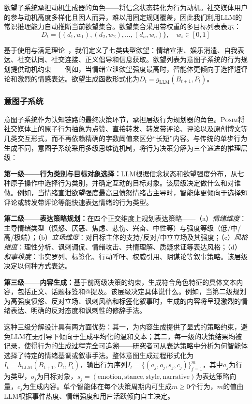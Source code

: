 \documentclass[lettersize,journal]{IEEEtran}
\newcommand{\posim}{\textsc{Posim}}
\begin{document}
欲望子系统承担动机生成器的角色——将信念状态转化为行为动机。社交媒体用户的参与动机高度多样化且因人而异，难以用固定规则覆盖，因此我们利用LLM的常识推理能力自动推断当前欲望集合。欲望集合采用带权重的多目标列表表示：
\begin{equation}
D_t = \{(d_1, w_1), (d_2, w_2), \ldots, (d_n, w_n)\}, \quad w_i \in [0, 1]
\end{equation}

基于使用与满足理论~\cite{katz_uses_1973}，我们定义了七类典型欲望：情绪宣泄、娱乐消遣、自我表达、社交认同、社交连接、正义倡导和信息获取。欲望列表为意图子系统的行为规划提供动机约束——例如，当情绪宣泄欲望强度最高时，智能体更倾向于选择短评论和激烈的情感表达。欲望生成函数形式化为$D_t = g_{\text{LLM}}(B_{t+1}, P_t)$。

\subsubsection{意图子系统}

意图子系统作为认知链路的最终决策环节，承担层级行为规划器的角色。\posim{}将社交媒体上的原子行为抽象为点赞、直接转发、转发带评论、评论以及原创博文等几类交互形式，而不再依赖精确的字数阈值来区分“长短”内容。与传统的单步行为生成不同，意图子系统采用多级思维链机制，将行为决策分解为三个递进的推理层级：

\textbf{第一级——行为类别与目标对象选择：}LLM根据信念状态和欲望强度分布，从七种原子操作中选择行为类别，并确定互动的目标对象。该层级决定做什么和对谁做。例如，当情绪宣泄欲望强度最高且愤怒情绪占主导时，智能体更倾向于选择短评论或转发带评论等能快速表达情绪的行为类型。

\textbf{第二级——表达策略规划：}在四个正交维度上规划表达策略——（a）\textit{情绪维度}：主导情绪类型（愤怒、厌恶、焦虑、悲伤、兴奋、中性等）与强度等级（低/中/高/极端）；（b）\textit{立场维度}：对目标主体的支持/反对/中立立场及其强度；（c）\textit{风格维度}：理性分析、讽刺调侃、情绪攻击、共情理解、质疑求证等表达风格；（d）\textit{叙事维度}：事实罗列、标签化、行动呼吁、权威引用、阴谋论等叙事策略。该层级决定以何种方式表达。

\textbf{第三级——内容生成：}基于前两级决策的约束，生成符合角色特征的具体文本内容，包括正文、话题标签和@提及。该层级决定具体说什么。例如，当第二级规划为高强度愤怒、反对立场、讽刺风格和标签化叙事时，生成的内容将呈现激烈的情绪表达、明确的反对态度和讽刺性的修辞手法。

这种三级分解设计具有两方面优势：其一，为内容生成提供了显式的策略约束，避免LLM在无引导下倾向于生成平均化的温和文本；其二，每一级的决策结果均被记录，使得行为的生成过程完全可追溯——研究者可从表达策略中分析为何智能体选择了特定的情绪基调或叙事手法。整体意图生成过程形式化为$I_t = h_{\text{LLM}}(B_{t+1}, D_t, P_t)$，输出行为序列$I_t = \{(a_j, o_j, s_j, c_j)\}_{j=1}^{m}$，其中$a_j$为行为类型，$o_j$为目标对象，$s_j = (\text{emotion}, \text{stance}, \text{style}, \text{narrative})$为表达策略向量，$c_j$为生成内容。单个智能体在每个决策周期内可生成$m \geq 0$个行为，$m$的值由LLM根据事件热度、情绪强度和用户活跃倾向自主决定。
\end{document}
